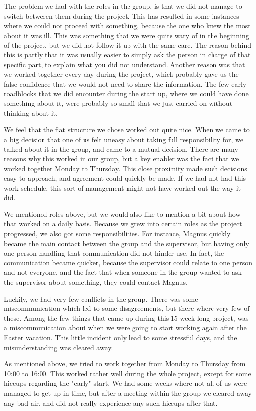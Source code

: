 The problem we had with the roles in the group, is that we did not manage to switch betweeen them during the project. This has resulted in some instances where we could not proceed with something, because the one who knew the most about it was ill. This was something that we were quite wary of in the beginning of the project, but we did not follow it up with the same care. The reason behind this is partly that it was usually easier to simply ask the person in charge of that specific part, to explain what you did not understand. Another reason was that we worked together every day during the project, which probably gave us the false confidence that we would not need to share the information. The few early roadblocks that we did encounter during the start up, where we could have done something about it, were probably so small that we just carried on without thinking about it.

We feel that the flat structure we chose worked out quite nice. When we came to a big decision that one of us felt uneasy about taking full responsibility for, we talked about it in the group, and came to a mutual decision. There are many reasons why this worked in our group, but a key enabler was the fact that we worked together Monday to Thursday. This close proximity made such decisions easy to approach, and agreement could quickly be made. If we had not had this work schedule, this sort of management might not have worked out the way it did.

We mentioned roles above, but we would also like to mention a bit about how that worked on a daily basis. Because we grew into certain roles as the project progressed, we also got some responsibilities. For instance, Magnus quickly became the main contact between the group and the supervisor, but having only one person handling that communication did not hinder use. In fact, the communication became quicker, because the supervisor could relate to one person and not everyone, and the fact that when someone in the group wanted to ask the supervisor about something, they could contact Magnus.

Luckily, we had very few conflicts in the group. There was some miscommunication which led to some disagreements, but there where very few of these. Among the few things that came up during this 15 week long project, was a miscommunication about when we were going to start working again after the Easter vacation. This little incident only lead to some stressful days, and the misunderstanding was cleared away.

As mentioned above, we tried to work together from Monday to Thursday from 10:00 to 16:00. This worked rather well during the whole project, except for some hiccups regarding the "early" start. We had some weeks where not all of us were managed to get up in time, but after a meeting within the group we cleared away any bad air, and did not really experience any such hiccups after that.
